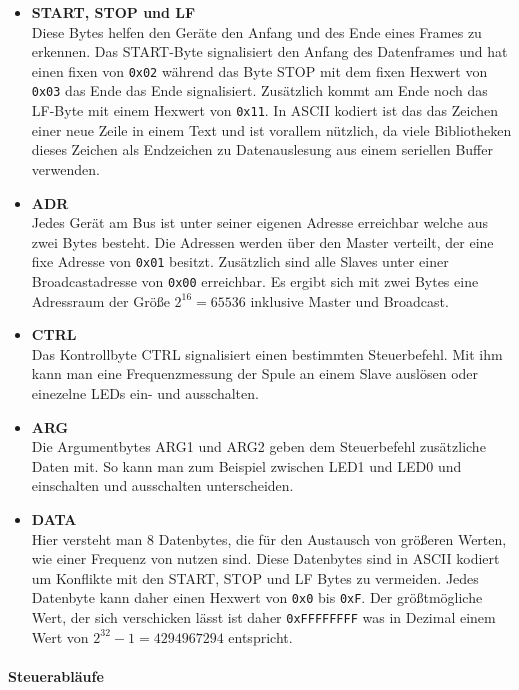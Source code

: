 \begin{itemize}
    \item \textbf{START, STOP und LF} \\
    Diese Bytes helfen den Geräte den Anfang und des Ende eines Frames zu erkennen. Das START-Byte signalisiert den Anfang des Datenframes und hat einen fixen von \texttt{0x02} während das Byte STOP mit dem 
    fixen Hexwert von \texttt{0x03} das Ende das Ende signalisiert. Zusätzlich kommt am Ende noch das LF-Byte mit einem Hexwert von \texttt{0x11}. In ASCII kodiert ist das das Zeichen einer neue Zeile in einem Text und ist vorallem nützlich, da
    viele Bibliotheken dieses Zeichen als Endzeichen zu Datenauslesung aus einem seriellen Buffer verwenden.
    \item \textbf{ADR} \\
    Jedes Gerät am Bus ist unter seiner eigenen Adresse erreichbar welche aus zwei Bytes besteht. Die Adressen werden über den Master verteilt, der eine fixe Adresse von \texttt{0x01} besitzt. 
    Zusätzlich sind alle Slaves unter einer Broadcastadresse von \texttt{0x00} erreichbar. Es ergibt sich mit zwei Bytes eine Adressraum der Größe $2^{16} = 65536$ inklusive Master und Broadcast.
    \item \textbf{CTRL} \\
    Das Kontrollbyte CTRL signalisiert einen bestimmten Steuerbefehl. Mit ihm kann man eine Frequenzmessung der Spule an einem Slave auslösen oder einezelne LEDs ein- und ausschalten.
    
    \item \textbf{ARG} \\
    Die Argumentbytes ARG1 und ARG2 geben dem Steuerbefehl zusätzliche Daten mit. 
    So kann man zum Beispiel zwischen LED1 und LED0 und einschalten und ausschalten unterscheiden. 
    
    \item \textbf{DATA} \\
    Hier versteht man 8 Datenbytes, die für den Austausch von größeren Werten, wie einer Frequenz von nutzen sind. Diese Datenbytes sind in ASCII kodiert um Konflikte mit den START, STOP und LF Bytes zu vermeiden. Jedes Datenbyte kann daher einen Hexwert von \texttt{0x0} bis 
    \texttt{0xF}. Der größtmögliche Wert, der sich verschicken lässt ist daher \texttt{0xFFFFFFFF} was in Dezimal einem Wert von $2^{32} - 1 = 4 294 967 294$ entspricht.
\end{itemize}

\paragraph{Steuerabläufe}\mbox{}\\

